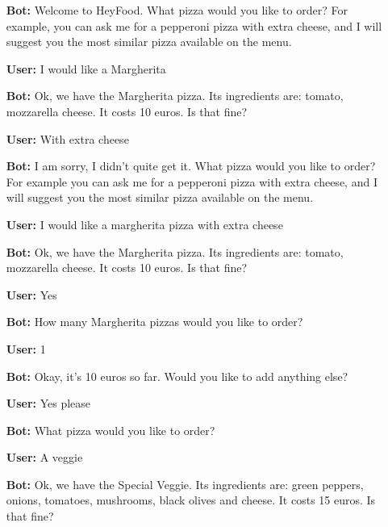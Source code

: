 \begin{itemize}

\item[\textbf{Bot:}] Welcome to HeyFood.
What pizza would you like to order? For example, you can ask me for a pepperoni pizza with extra cheese, and I will suggest you the most similar pizza available on the menu.

\item[\textbf{User:}] I would like a Margherita

\item[\textbf{Bot:}] Ok, we have the Margherita pizza. Its ingredients are: tomato, mozzarella cheese. It costs 10 euros. Is that fine?

\item[\textbf{User:}] With extra cheese

\item[\textbf{Bot:}] I am sorry, I didn’t quite get it. What pizza would you like to order? For example you can ask me for a pepperoni pizza with extra cheese, and I will suggest you the most similar pizza available on the menu.

\item[\textbf{User:}] I would like a margherita pizza with extra cheese

\item[\textbf{Bot:}] Ok, we have the Margherita pizza. Its ingredients are: tomato, mozzarella cheese. It costs 10 euros. Is that fine?

\item[\textbf{User:}] Yes

\item[\textbf{Bot:}] How many Margherita pizzas would you like to order?

\item[\textbf{User:}] 1

\item[\textbf{Bot:}] Okay, it’s 10 euros so far. Would you like to add anything else?

\item[\textbf{User:}] Yes please

\item[\textbf{Bot:}] What pizza would you like to order?

\item[\textbf{User:}] A veggie

\item[\textbf{Bot:}] Ok, we have the Special Veggie. Its ingredients are: green peppers, onions, tomatoes, mushrooms, black olives and cheese. It costs 15 euros. Is that fine?


\end{itemize}
